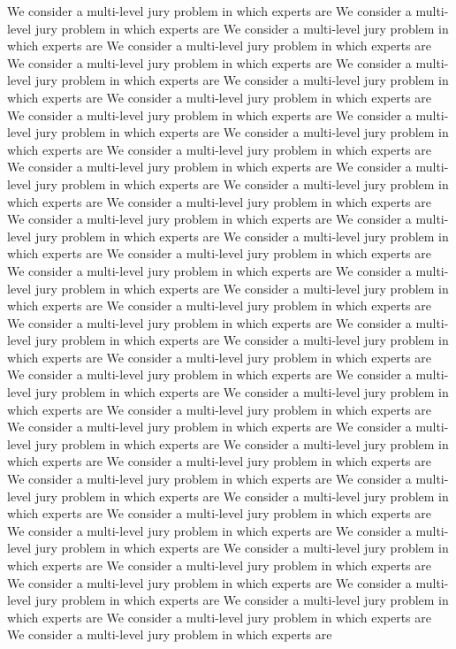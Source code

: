 \documentclass[letterpaper]{article}
\numberwithin{equation}{section}	%
\begin{document}
We consider a multi-level jury problem in which experts are
We consider a multi-level jury problem in which experts are
We consider a multi-level jury problem in which experts are
We consider a multi-level jury problem in which experts are
We consider a multi-level jury problem in which experts are
We consider a multi-level jury problem in which experts are
We consider a multi-level jury problem in which experts are
We consider a multi-level jury problem in which experts are
We consider a multi-level jury problem in which experts are
We consider a multi-level jury problem in which experts are
We consider a multi-level jury problem in which experts are
We consider a multi-level jury problem in which experts are
We consider a multi-level jury problem in which experts are
We consider a multi-level jury problem in which experts are
We consider a multi-level jury problem in which experts are
We consider a multi-level jury problem in which experts are
We consider a multi-level jury problem in which experts are
We consider a multi-level jury problem in which experts are
We consider a multi-level jury problem in which experts are
We consider a multi-level jury problem in which experts are
We consider a multi-level jury problem in which experts are
We consider a multi-level jury problem in which experts are
We consider a multi-level jury problem in which experts are
We consider a multi-level jury problem in which experts are
We consider a multi-level jury problem in which experts are
We consider a multi-level jury problem in which experts are
We consider a multi-level jury problem in which experts are
We consider a multi-level jury problem in which experts are
We consider a multi-level jury problem in which experts are
We consider a multi-level jury problem in which experts are
We consider a multi-level jury problem in which experts are
We consider a multi-level jury problem in which experts are
We consider a multi-level jury problem in which experts are
We consider a multi-level jury problem in which experts are
We consider a multi-level jury problem in which experts are
We consider a multi-level jury problem in which experts are
We consider a multi-level jury problem in which experts are
We consider a multi-level jury problem in which experts are
We consider a multi-level jury problem in which experts are
We consider a multi-level jury problem in which experts are
We consider a multi-level jury problem in which experts are
We consider a multi-level jury problem in which experts are
We consider a multi-level jury problem in which experts are
We consider a multi-level jury problem in which experts are
We consider a multi-level jury problem in which experts are
We consider a multi-level jury problem in which experts are
We consider a multi-level jury problem in which experts are
We consider a multi-level jury problem in which experts are
We consider a multi-level jury problem in which experts are

\clearpage
\end{document}
